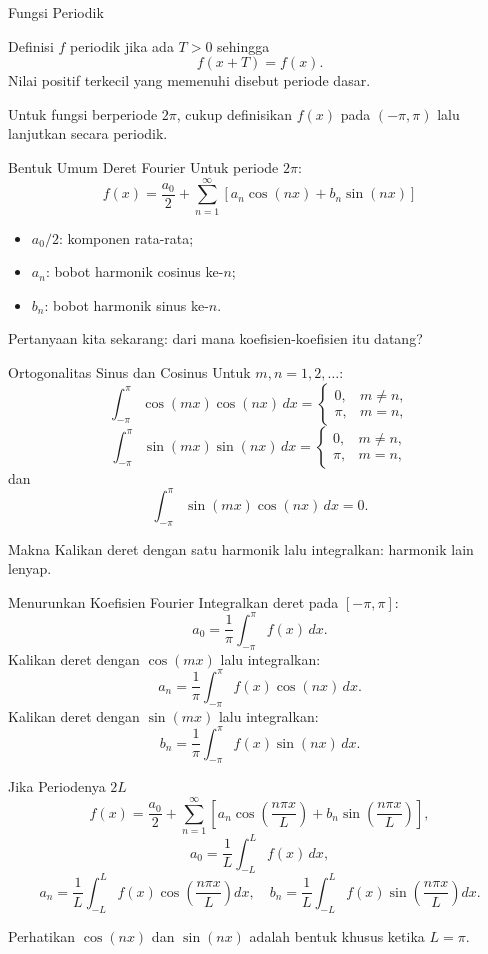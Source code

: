 \documentclass[aspectratio=169,10pt]{beamer}
\begin{document}
\begin{frame}{Fungsi Periodik}
\begin{block}{Definisi}
$f$ periodik jika ada $T>0$ sehingga
\[
f(x+T)=f(x).
\]
Nilai positif terkecil yang memenuhi disebut periode dasar.
\end{block}
Untuk fungsi berperiode $2\pi$, cukup definisikan $f(x)$ pada $(-\pi,\pi)$ lalu lanjutkan secara periodik.
\end{frame}


\begin{frame}{Bentuk Umum Deret Fourier}
Untuk periode $2\pi$:
\[
\boxed{f(x)=\frac{a_0}{2}+\sum_{n=1}^{\infty}\left[a_n\cos(nx)+b_n\sin(nx)\right]}
\]
\begin{itemize}
\item $a_0/2$: komponen rata-rata;
\item $a_n$: bobot harmonik cosinus ke-$n$;
\item $b_n$: bobot harmonik sinus ke-$n$.
\end{itemize}
Pertanyaan kita sekarang: dari mana koefisien-koefisien itu datang?
\end{frame}


\begin{frame}{Ortogonalitas Sinus dan Cosinus}
Untuk $m,n=1,2,\ldots$:
\[
\int_{-\pi}^{\pi}\cos(mx)\cos(nx)\,dx=
\begin{cases}0,&m\ne n,\\ \pi,&m=n,\end{cases}
\]
\[
\int_{-\pi}^{\pi}\sin(mx)\sin(nx)\,dx=
\begin{cases}0,&m\ne n,\\ \pi,&m=n,\end{cases}
\]
dan
\[
\int_{-\pi}^{\pi}\sin(mx)\cos(nx)\,dx=0.
\]
\begin{block}{Makna}
Kalikan deret dengan satu harmonik lalu integralkan: harmonik lain lenyap.
\end{block}
\end{frame}


\begin{frame}{Menurunkan Koefisien Fourier}
Integralkan deret pada $[-\pi,\pi]$:
\[
\boxed{a_0=\frac1\pi\int_{-\pi}^{\pi}f(x)\,dx.}
\]
Kalikan deret dengan $\cos(mx)$ lalu integralkan:
\[
\boxed{a_n=\frac1\pi\int_{-\pi}^{\pi}f(x)\cos(nx)\,dx.}
\]
Kalikan deret dengan $\sin(mx)$ lalu integralkan:
\[
\boxed{b_n=\frac1\pi\int_{-\pi}^{\pi}f(x)\sin(nx)\,dx.}
\]
\end{frame}


\begin{frame}{Jika Periodenya $2L$}
\[
f(x)=\frac{a_0}{2}+\sum_{n=1}^{\infty}\left[
a_n\cos\left(\frac{n\pi x}{L}\right)+
b_n\sin\left(\frac{n\pi x}{L}\right)\right],
\]
\[
a_0=\frac1L\int_{-L}^{L}f(x)\,dx,
\]
\[
a_n=\frac1L\int_{-L}^{L}f(x)\cos\left(\frac{n\pi x}{L}\right)dx,\quad
b_n=\frac1L\int_{-L}^{L}f(x)\sin\left(\frac{n\pi x}{L}\right)dx.
\]
\begin{alertblock}{Perhatikan}
$\cos(nx)$ dan $\sin(nx)$ adalah bentuk khusus ketika $L=\pi$.
\end{alertblock}
\end{frame}
\end{document}
